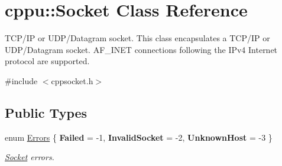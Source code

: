 \hypertarget{classcppu_1_1_socket}{}\section{cppu\+::Socket Class Reference}
\label{classcppu_1_1_socket}


T\+C\+P/\+IP or U\+D\+P/\+Datagram socket. This class encapsulates a T\+C\+P/\+IP or U\+D\+P/\+Datagram socket. A\+F\+\_\+\+I\+N\+ET connections following the I\+Pv4 Internet protocol are supported.  




{\ttfamily \#include $<$cppsocket.\+h$>$}

\subsection*{Public Types}
\begin{DoxyCompactItemize}
\item 
enum \mbox{\hyperlink{classcppu_1_1_socket_a49ea5cb079bd7ae97ecf7eb30c9d9e5f}{Errors}} \{ {\bfseries Failed} = -\/1, 
{\bfseries Invalid\+Socket} = -\/2, 
{\bfseries Unknown\+Host} = -\/3
 \}
\begin{DoxyCompactList}\small\item\em \mbox{\hyperlink{classcppu_1_1_socket}{Socket}} errors. \end{DoxyCompactList}\end{DoxyCompactItemize}
